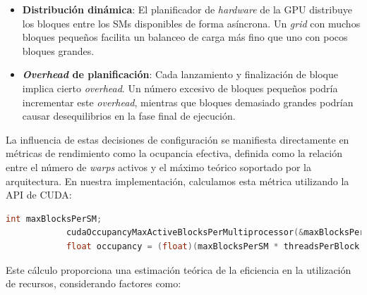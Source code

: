 \begin{enumerate}
\begin{itemize}
                    \item \textbf{Distribución dinámica}: El planificador de \textit{hardware} de la GPU distribuye los bloques entre los SMs disponibles de forma asíncrona. Un \textit{grid} con muchos bloques pequeños facilita un balanceo de carga más fino que uno con pocos bloques grandes.
                    
                    \item \textbf{\textit{Overhead} de planificación}: Cada lanzamiento y finalización de bloque implica cierto \textit{overhead}. Un número excesivo de bloques pequeños podría incrementar este \textit{overhead}, mientras que bloques demasiado grandes podrían causar desequilibrios en la fase final de ejecución.
                    
                \end{itemize}
            
        \end{enumerate}

        La influencia de estas decisiones de configuración se manifiesta directamente en métricas de rendimiento como la ocupancia efectiva, definida como la relación entre el número de \textit{warps} activos y el máximo teórico soportado por la arquitectura. En nuestra implementación, calculamos esta métrica utilizando la API de CUDA:
        
        \begin{lstlisting}[language=C, caption={Calculo de ocupancia teorica.}, gobble=12]
            int maxBlocksPerSM;
            cudaOccupancyMaxActiveBlocksPerMultiprocessor(&maxBlocksPerSM, daxpy, threadsPerBlock, 0);
            float occupancy = (float)(maxBlocksPerSM * threadsPerBlock / 32) /  (float)(prop.maxThreadsPerMultiProcessor / 32);
        \end{lstlisting}

        Este cálculo proporciona una estimación teórica de la eficiencia en la utilización de recursos, considerando factores como:

